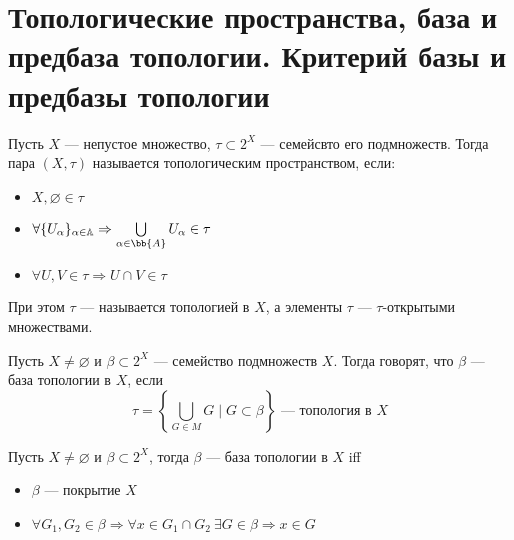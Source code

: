 \newpage
\section{Топологические пространства, база и предбаза топологии. Критерий базы и предбазы топологии}

\begin{definition}
	Пусть $X$ --- непустое множество, $\tau \subset 2^X$ --- семейсвто его подмножеств. Тогда пара $(X, \tau)$ называется топологическим пространством, если:
	\begin{itemize}
		\item $X, \varnothing \in \tau$
		\item $\forall \{U_\alpha\}_{\alpha \in \mathbb{A}} \Rightarrow \bigcup\limits_{\alpha \in \bb{A}}U_\alpha \in \tau$
		\item $\forall U, V \in \tau \Rightarrow U \cap V \in \tau$
	\end{itemize}
При этом $\tau$ --- называется топологией в $X$, а элементы $\tau$ --- $\tau$-открытыми множествами.
\end{definition} 

\begin{definition}
	Пусть $X \neq \varnothing$ и $\beta \subset 2^X$ --- семейство подмножеств $X$. Тогда говорят, что $\beta$ --- база топологии в $X$, если 
	$$
	\tau = \left\{\bigcup\limits_{G \in M }G \mid G \subset \beta \right\} \text{ --- топология в } X
	$$
\end{definition}

\begin{theorem}
	Пусть $X \neq \varnothing$ и $\beta \subset 2^X$, тогда $\beta$ --- база топологии в $X$ iff 
	\begin{itemize}
		\item $\beta$ --- покрытие $X$ 
		\item $\forall G_1, G_2 \in \beta \Rightarrow \forall x \in G_1 \cap G_2 \ \exists G \in \beta \Rightarrow x \in G$
	\end{itemize}
\end{theorem}

